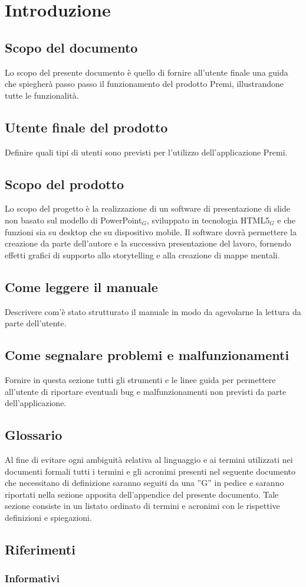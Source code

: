 \section{Introduzione}
\subsection{Scopo del documento}
Lo scopo del presente documento è quello di fornire all'utente finale una guida che spiegherà passo passo il funzionamento del prodotto Premi, illustrandone tutte le funzionalità.

\subsection{Utente finale del prodotto}
Definire quali tipi di utenti sono previsti per l'utilizzo dell'applicazione Premi.

\subsection{Scopo del prodotto}
Lo scopo del progetto è la realizzazione di un software di presentazione di slide non basato sul modello di PowerPoint$_{G}$, sviluppato in tecnologia HTML5$_{G}$ e che funzioni sia su desktop che su dispositivo mobile. Il software dovrà permettere la creazione da parte dell'autore e la successiva presentazione del lavoro, fornendo effetti grafici di supporto allo storytelling e alla creazione di mappe mentali.

\subsection{Come leggere il manuale}
Descrivere com'è stato strutturato il manuale in modo da agevolarne la lettura da parte dell'utente.

\subsection{Come segnalare problemi e malfunzionamenti}
Fornire in questa sezione tutti gli strumenti e le linee guida per permettere all'utente di riportare eventuali bug e malfunzionamenti non previsti da parte dell'applicazione.

\subsection{Glossario}
Al fine di evitare ogni ambiguità relativa al linguaggio e ai termini utilizzati nei documenti formali tutti i termini e gli acronimi presenti nel seguente documento che necessitano di definizione saranno seguiti da una ”G” in pedice e saranno riportati nella sezione apposita dell'appendice del presente documento. Tale sezione consiste in un listato ordinato di termini e acronimi con le rispettive definizioni e spiegazioni.

\subsection{Riferimenti}
\subsubsection{Informativi}

\newpage